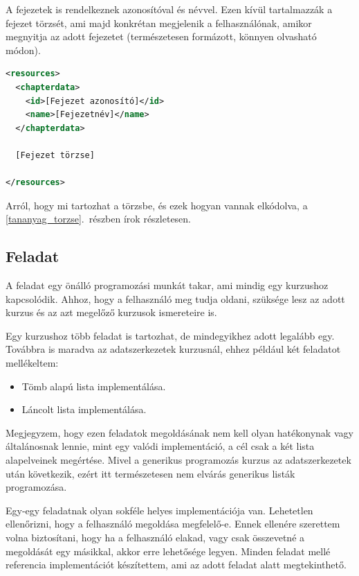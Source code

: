 \documentclass[12pt,a4paper]{article}
\begin{document}
	A fejezetek is rendelkeznek azonosítóval és névvel. Ezen kívül tartalmazzák a fejezet törzsét, ami majd konkrétan megjelenik a felhasználónak, amikor megnyitja az adott fejezetet (természetesen formázott, könnyen olvasható módon). 
	
	\bigskip
	\begin{lstlisting}[language=XML]
<resources>
  <chapterdata>
	<id>[Fejezet azonosító]</id>
    <name>[Fejezetnév]</name>
  </chapterdata>

  [Fejezet törzse]	
	
</resources>
	\end{lstlisting}
	
	Arról, hogy mi tartozhat a törzsbe, és ezek hogyan vannak elkódolva, a \ref{tananyag_torzse}.\ részben írok részletesen.
	
	\subsection{Feladat}\label{feladat}
	
	A feladat egy önálló programozási munkát takar, ami mindig egy kurzushoz kapcsolódik. Ahhoz, hogy a felhasználó meg tudja oldani, szüksége lesz az adott kurzus és az azt megelőző kurzusok ismereteire is.
	
	Egy kurzushoz több feladat is tartozhat, de mindegyikhez adott legalább egy. Továbbra is maradva az adatszerkezetek kurzusnál, ehhez például két feladatot mellékeltem:
	
	\begin{itemize}
		\item Tömb alapú lista implementálása.
		\item Láncolt lista implementálása.
	\end{itemize}

	Megjegyzem, hogy ezen feladatok megoldásának nem kell olyan hatékonynak vagy általánosnak lennie, mint egy valódi implementáció, a cél csak a két lista alapelveinek megértése. Mivel a generikus programozás kurzus az adatszerkezetek után következik, ezért itt természetesen nem elvárás generikus listák programozása.

	Egy-egy feladatnak olyan sokféle helyes implementációja van. Lehetetlen ellenőrizni, hogy a felhasználó megoldása megfelelő-e. Ennek ellenére szerettem volna biztosítani, hogy ha a felhasználó elakad, vagy csak összevetné a megoldását egy másikkal, akkor erre lehetősége legyen. Minden feladat mellé referencia implementációt készítettem, ami az adott feladat alatt megtekinthető. 
\end{document}
